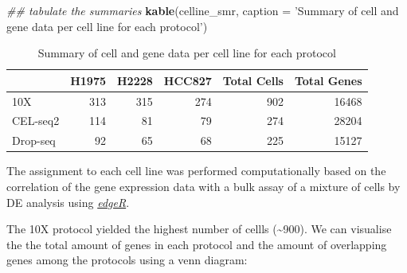 \documentclass[]{book}
\newenvironment{Shaded}{\begin{snugshade}}{\end{snugshade}}
\newcommand{\CommentTok}[1]{\textcolor[rgb]{0.56,0.35,0.01}{\textit{#1}}}
\newcommand{\DataTypeTok}[1]{\textcolor[rgb]{0.13,0.29,0.53}{#1}}
\newcommand{\KeywordTok}[1]{\textcolor[rgb]{0.13,0.29,0.53}{\textbf{#1}}}
\newcommand{\NormalTok}[1]{#1}
\newcommand{\StringTok}[1]{\textcolor[rgb]{0.31,0.60,0.02}{#1}}
\theoremstyle{definition}
\theoremstyle{definition}
\theoremstyle{definition}
\theoremstyle{remark}
\begin{document}
\begin{Shaded}
\begin{Highlighting}[]
\CommentTok{## tabulate the summaries}
\KeywordTok{kable}\NormalTok{(celline_smr,}
      \DataTypeTok{caption =} \StringTok{'Summary of cell and gene data }
\StringTok{      per cell line for each protocol'}\NormalTok{)}
\end{Highlighting}
\end{Shaded}

\begin{table}

\caption{\label{tab:1-summaryKable}Summary of cell and gene data 
      per cell line for each protocol}
\centering
\begin{tabular}[t]{l|r|r|r|r|r}
\hline
  & H1975 & H2228 & HCC827 & Total Cells & Total Genes\\
\hline
10X & 313 & 315 & 274 & 902 & 16468\\
\hline
CEL-seq2 & 114 & 81 & 79 & 274 & 28204\\
\hline
Drop-seq & 92 & 65 & 68 & 225 & 15127\\
\hline
\end{tabular}
\end{table}

The assignment to each cell line was performed computationally based on
the correlation of the gene expression data with a bulk assay of a
mixture of cells by DE analysis using
\href{https://bioconductor.org/packages/release/bioc/html/edgeR.html}{\emph{edgeR}}.

The 10X protocol yielded the highest number of cellls
(\textasciitilde{}900). We can visualise the the total amount of genes
in each protocol and the amount of overlapping genes among the protocols
using a venn diagram:
\end{document}
